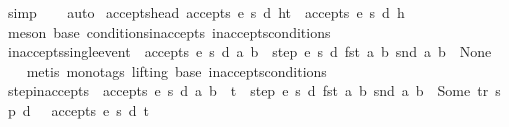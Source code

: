 \begin{isabellebody}
\ simp\isanewline
\ \ \isamarkupfalse%
\ auto%
\endisatagproof
{\isafoldproof}%
%
\isadelimproof
\isanewline
%
\endisadelimproof
\isanewline
{}\isamarkupfalse%
\ accepts{\isacharunderscore}head{\isacharcolon}\ {\isachardoublequoteopen}accepts\ e\ s\ d\ {\isacharparenleft}h{\isacharhash}t{\isacharparenright}\ {\isasymLongrightarrow}\ accepts\ e\ s\ d\ {\isacharbrackleft}h{\isacharbrackright}{\isachardoublequoteclose}\isanewline
%
\isadelimproof
\ \ %
\endisadelimproof
%
\isatagproof
{}\isamarkupfalse%
\ {\isacharparenleft}meson\ base\ conditions{\isacharunderscore}inaccepts\ inaccepts{\isacharunderscore}conditions{\isacharparenright}%
\endisatagproof
{\isafoldproof}%
%
\isadelimproof
\isanewline
%
\endisadelimproof
\isanewline
{}\isamarkupfalse%
\ inaccepts{\isacharunderscore}single{\isacharunderscore}event{\isacharcolon}\ {\isachardoublequoteopen}{\isasymnot}\ accepts\ e\ s\ d\ {\isacharbrackleft}{\isacharparenleft}a{\isacharcomma}\ b{\isacharparenright}{\isacharbrackright}\ {\isasymLongrightarrow}\ step\ e\ s\ d\ {\isacharparenleft}fst\ {\isacharparenleft}a{\isacharcomma}\ b{\isacharparenright}{\isacharparenright}\ {\isacharparenleft}snd\ {\isacharparenleft}a{\isacharcomma}\ b{\isacharparenright}{\isacharparenright}\ {\isacharequal}\ None{\isachardoublequoteclose}\isanewline
%
\isadelimproof
\ \ %
\endisadelimproof
%
\isatagproof
{}\isamarkupfalse%
\ {\isacharparenleft}metis\ {\isacharparenleft}mono{\isacharunderscore}tags{\isacharcomma}\ lifting{\isacharparenright}\ base\ inaccepts{\isacharunderscore}conditions{\isacharparenright}%
\endisatagproof
{\isafoldproof}%
%
\isadelimproof
\isanewline
%
\endisadelimproof
\isanewline
{}\isamarkupfalse%
\ step{\isacharunderscore}inaccepts{\isacharcolon}\ {\isachardoublequoteopen}{\isasymnot}\ accepts\ e\ s\ d\ {\isacharparenleft}{\isacharparenleft}a{\isacharcomma}\ b{\isacharparenright}\ {\isacharhash}\ t{\isacharparenright}\ {\isasymLongrightarrow}\ step\ e\ s\ d\ {\isacharparenleft}fst\ {\isacharparenleft}a{\isacharcomma}\ b{\isacharparenright}{\isacharparenright}\ {\isacharparenleft}snd\ {\isacharparenleft}a{\isacharcomma}\ b{\isacharparenright}{\isacharparenright}\ {\isacharequal}\ Some\ {\isacharparenleft}tr{\isacharcomma}\ s{\isacharprime}{\isacharcomma}\ p{\isacharprime}{\isacharcomma}\ d{\isacharprime}{\isacharparenright}\ {\isasymLongrightarrow}\ {\isasymnot}\ accepts\ e\ s{\isacharprime}\ d{\isacharprime}\ t{\isachardoublequoteclose}\isanewline
%
\isadelimproof
\ \ %
\endisadelimproof
%
\isatagproof
{}\isamarkupfalse%

\end{isabellebody}
